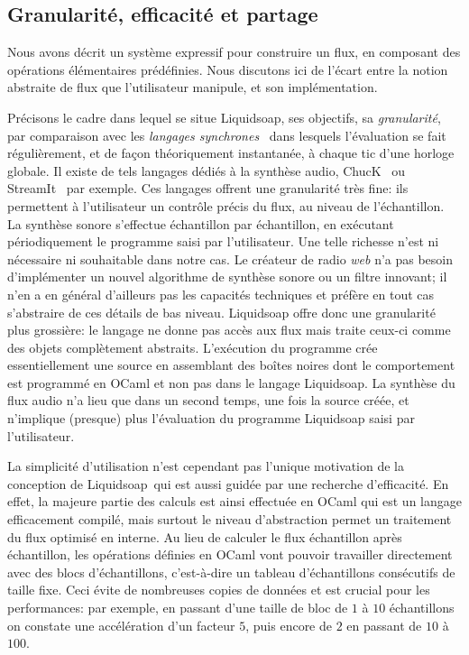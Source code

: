 \documentclass[twoside]{article}
\newcommand{\liquidsoap}{Liquidsoap}
\theoremstyle{plain}
\theoremstyle{definition}
\theoremstyle{remark}
\begin{document}
\subsection{Granularité, efficacité et partage}

Nous avons décrit un système expressif pour construire un flux, en composant
des opérations élémentaires prédéfinies. Nous
discutons ici de l'écart entre la notion abstraite de flux que
l'utilisateur manipule, et son implémentation.

Précisons le cadre dans lequel se situe \liquidsoap{}, ses objectifs, sa
\emph{granularité}, par comparaison avec les
\emph{langages synchrones}~\cite{benveniste-berry:synchronous} dans lesquels
l'évaluation se fait régulièrement, et de façon théoriquement instantanée,
à chaque tic d'une horloge globale.
Il existe de tels langages dédiés à la synthèse audio, ChucK~\cite{chuck}
ou StreamIt~\cite{streamit} par exemple.
Ces langages offrent une granularité très fine: ils permettent à
l'utilisateur un contrôle précis du flux, au niveau de l'échantillon. La
synthèse sonore s'effectue échantillon par échantillon, en exécutant
périodiquement le programme saisi par l'utilisateur.
Une telle richesse
n'est ni nécessaire ni souhaitable dans notre cas. Le créateur de radio
\emph{web} n'a pas besoin d'implémenter un nouvel algorithme de synthèse sonore
ou un filtre innovant; il n'en a en général d'ailleurs pas les capacités
techniques et préfère en tout cas s'abstraire de ces détails de bas
niveau. \liquidsoap{} offre donc une granularité plus grossière: le langage ne
donne pas accès aux flux mais traite ceux-ci comme des objets complètement
abstraits. L'exécution du programme crée essentiellement une source en
assemblant des boîtes noires dont le comportement est programmé en OCaml et non
pas dans le langage \liquidsoap{}. La synthèse du flux audio n'a lieu
que dans un second temps, une fois la source créée, et n'implique (presque) plus
l'évaluation du programme \liquidsoap{} saisi par l'utilisateur.

La simplicité d'utilisation n'est cependant pas l'unique motivation de la
conception de \liquidsoap\ qui est aussi guidée par une recherche d'efficacité.
En effet, la majeure partie des calculs est ainsi effectuée
en OCaml qui est un langage efficacement compilé,
mais surtout le niveau d'abstraction permet un traitement
du flux optimisé en interne. Au lieu de calculer le flux échantillon après
échantillon, les opérations définies en OCaml vont pouvoir travailler
directement avec des blocs d'échantillons,
c'est-à-dire un tableau d'échantillons consécutifs de taille fixe.
Ceci évite de nombreuses copies de
données et est crucial pour les performances: par exemple, en passant d'une
taille de bloc de $1$ à $10$ échantillons on constate une accélération d'un
facteur $5$, puis encore de $2$ en passant de $10$ à $100$.
\end{document}
